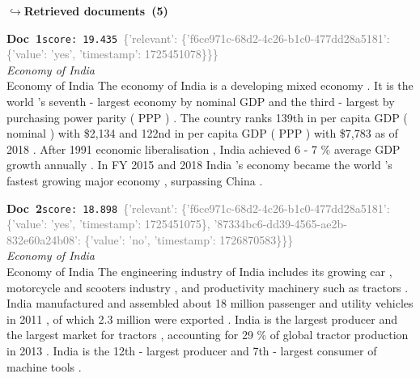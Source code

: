 \documentclass[a4paper,11pt]{article}
\begin{document}
\noindent\hfill{\footnotesize\textcolor{doccolor}{\textbf{$\hookrightarrow$\enspace Retrieved documents~(5)}}}
\begin{docenv}
{\footnotesize\textcolor{doccolor}{\textbf{Doc~1}}}\hfill{\tiny\texttt{score:~19.435}}\ {\tiny\textcolor{gray}{\{'relevant': \{'f6ce971c-68d2-4c26-b1c0-477dd28a5181': \{'value': 'yes', 'timestamp': 1725451078\}\}\}}}\\[3pt]
{\small\textit{Economy of India}}\\[2pt]
\vspace{2pt}
{\footnotesize Economy of India
The economy of India is a developing mixed economy . It is the world 's seventh - largest economy by nominal GDP and the third - largest by purchasing power parity ( PPP ) . The country ranks 139th in per capita GDP ( nominal ) with \$2,134 and 122nd in per capita GDP ( PPP ) with \$7,783 as of 2018 . After 1991 economic liberalisation , India achieved 6 - 7 \% average GDP growth annually . In FY 2015 and 2018 India 's economy became the world 's fastest growing major economy , surpassing China .}
\end{docenv}
\begin{docenv}
{\footnotesize\textcolor{doccolor}{\textbf{Doc~2}}}\hfill{\tiny\texttt{score:~18.898}}\ {\tiny\textcolor{gray}{\{'relevant': \{'f6ce971c-68d2-4c26-b1c0-477dd28a5181': \{'value': 'yes', 'timestamp': 1725451075\}, '87334bc6-dd39-4565-ae2b-832e60a24b08': \{'value': 'no', 'timestamp': 1726870583\}\}\}}}\\[3pt]
{\small\textit{Economy of India}}\\[2pt]
\vspace{2pt}
{\footnotesize Economy of India
The engineering industry of India includes its growing car , motorcycle and scooters industry , and productivity machinery such as tractors . India manufactured and assembled about 18 million passenger and utility vehicles in 2011 , of which 2.3 million were exported . India is the largest producer and the largest market for tractors , accounting for 29 \% of global tractor production in 2013 . India is the 12th - largest producer and 7th - largest consumer of machine tools .}
\end{docenv}
\end{document}
